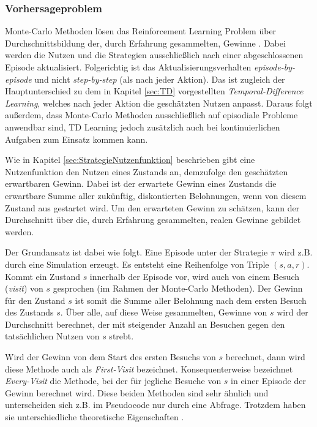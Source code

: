 \subsubsection{Vorhersageproblem}
Monte-Carlo Methoden lösen das Reinforcement Learning Problem über Durchschnittsbildung der, durch Erfahrung gesammelten, Gewinne \cite[S.~91]{Sutton1998}. Dabei werden die Nutzen und die Strategien ausschließlich nach einer abgeschlossenen Episode aktualisiert.
\newpage
 Folgerichtig ist das Aktualisierungsverhalten \textit{episode-by-episode} und nicht \textit{step-by-step} (als nach jeder Aktion)\cite[S.~91]{Sutton1998}. Das ist zugleich der Hauptunterschied zu dem in Kapitel \ref{sec:TD} vorgestellten \textit{Temporal-Difference Learning}, welches nach jeder Aktion die geschätzten Nutzen anpasst. Daraus folgt außerdem, dass Monte-Carlo Methoden ausschließlich auf episodiale Probleme anwendbar sind, TD Learning jedoch zusätzlich auch bei kontinuierlichen Aufgaben zum Einsatz kommen kann. 
\par
Wie in Kapitel \ref{sec:StrategieNutzenfunktion} beschrieben gibt eine Nutzenfunktion den Nutzen eines Zustands an, demzufolge den geschätzten erwartbaren Gewinn. Dabei ist der erwartete Gewinn eines Zustands die erwartbare Summe aller zukünftig, diskontierten Belohnungen, wenn von diesem Zustand aus gestartet wird. Um den erwarteten Gewinn zu schätzen, kann der Durchschnitt über die, durch Erfahrung gesammelten, realen Gewinne gebildet werden.
\par 
Der Grundansatz ist dabei wie folgt. Eine Episode unter der Strategie $\pi$ wird z.B. durch eine Simulation erzeugt. Es entsteht eine Reihenfolge von Triple $(s,a,r)$. Kommt ein Zustand $s$ innerhalb der Episode vor, wird auch von einem Besuch (\textit{visit}) von $s$ gesprochen (im Rahmen der Monte-Carlo Methoden). Der Gewinn für den Zustand $s$ ist somit die Summe aller Belohnung nach dem ersten Besuch des Zustands $s$. Über alle, auf diese Weise gesammelten, Gewinne von $s$ wird der Durchschnitt berechnet, der mit steigender Anzahl an Besuchen gegen den tatsächlichen Nutzen von $s$ strebt.
\par 
Wird der Gewinn von dem Start des ersten Besuchs von $s$ berechnet, dann wird diese Methode auch als \textit{First-Visit} bezeichnet. Konsequenterweise bezeichnet \textit{Every-Visit} die Methode, bei der für jegliche Besuche von $s$ in einer Episode der Gewinn berechnet wird. Diese beiden Methoden sind sehr ähnlich und unterscheiden sich z.B. im Pseudocode nur durch eine Abfrage. Trotzdem haben sie unterschiedliche theoretische Eigenschaften \cite[S.~92]{Sutton1998}.
